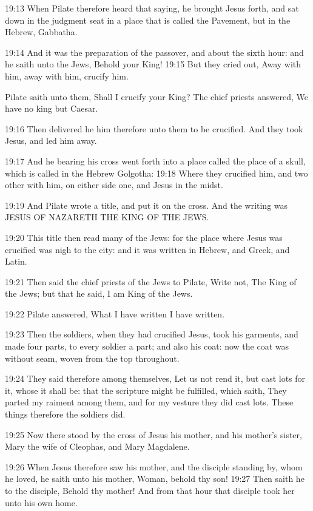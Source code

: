 19:13 When Pilate therefore heard that saying, he brought Jesus forth,
and sat down in the judgment seat in a place that is called the
Pavement, but in the Hebrew, Gabbatha.

19:14 And it was the preparation of the passover, and about the sixth
hour: and he saith unto the Jews, Behold your King!  19:15 But they
cried out, Away with him, away with him, crucify him.

Pilate saith unto them, Shall I crucify your King? The chief priests
answered, We have no king but Caesar.

19:16 Then delivered he him therefore unto them to be crucified. And
they took Jesus, and led him away.

19:17 And he bearing his cross went forth into a place called the
place of a skull, which is called in the Hebrew Golgotha: 19:18 Where
they crucified him, and two other with him, on either side one, and
Jesus in the midst.

19:19 And Pilate wrote a title, and put it on the cross. And the
writing was JESUS OF NAZARETH THE KING OF THE JEWS.

19:20 This title then read many of the Jews: for the place where Jesus
was crucified was nigh to the city: and it was written in Hebrew, and
Greek, and Latin.

19:21 Then said the chief priests of the Jews to Pilate, Write not,
The King of the Jews; but that he said, I am King of the Jews.

19:22 Pilate answered, What I have written I have written.

19:23 Then the soldiers, when they had crucified Jesus, took his
garments, and made four parts, to every soldier a part; and also his
coat: now the coat was without seam, woven from the top throughout.

19:24 They said therefore among themselves, Let us not rend it, but
cast lots for it, whose it shall be: that the scripture might be
fulfilled, which saith, They parted my raiment among them, and for my
vesture they did cast lots. These things therefore the soldiers did.

19:25 Now there stood by the cross of Jesus his mother, and his
mother's sister, Mary the wife of Cleophas, and Mary Magdalene.

19:26 When Jesus therefore saw his mother, and the disciple standing
by, whom he loved, he saith unto his mother, Woman, behold thy son!
19:27 Then saith he to the disciple, Behold thy mother! And from that
hour that disciple took her unto his own home.


